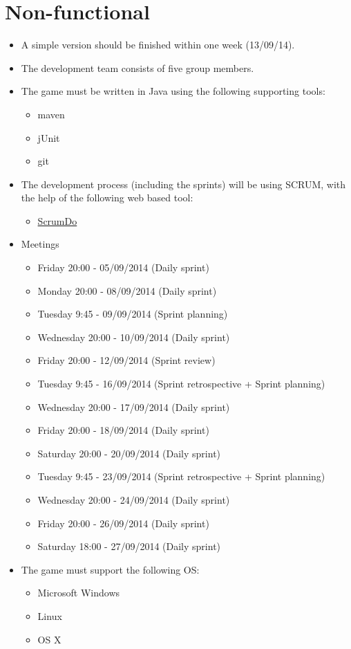 \documentclass[a4paper,11pt]{article}
\begin{document}
\newpage
\section*{Non-functional}
\begin{itemize}
  \item A simple version should be finished within one week (13/09/14).
  \item The development team consists of five group members.
  \item The game must be written in Java using the following supporting tools:
  \begin{itemize}
    \item maven
    \item jUnit
    \item git
  \end{itemize}

  \item The development process (including the sprints) will be using SCRUM,
        with the help of the following web based tool:
  \begin{itemize}
    \item \href{https://www.scrumdo.org/}{ScrumDo}
  \end{itemize}

  \item Meetings
  \begin{itemize}
    \item Friday	20:00 - 05/09/2014 (Daily sprint)
    \item Monday	20:00 - 08/09/2014 (Daily sprint)
    \item Tuesday	 9:45 - 09/09/2014 (Sprint planning)
    \item Wednesday	20:00 - 10/09/2014 (Daily sprint)
    \item Friday	20:00 - 12/09/2014 (Sprint review)
    \item Tuesday	 9:45 - 16/09/2014 (Sprint retrospective + Sprint planning)
    \item Wednesday	20:00 - 17/09/2014 (Daily sprint)
    \item Friday	20:00 - 18/09/2014 (Daily sprint)
    \item Saturday	20:00 - 20/09/2014 (Daily sprint)
    \item Tuesday	 9:45 - 23/09/2014 (Sprint retrospective + Sprint planning)
    \item Wednesday	20:00 - 24/09/2014 (Daily sprint)
    \item Friday	20:00 - 26/09/2014 (Daily sprint)
    \item Saturday	18:00 - 27/09/2014 (Daily sprint)
 
  \end{itemize}

  \item The game must support the following OS:
  \begin{itemize}
    \item Microsoft Windows
    \item Linux
    \item OS X
  \end{itemize}
\end{itemize}
\end{document}
